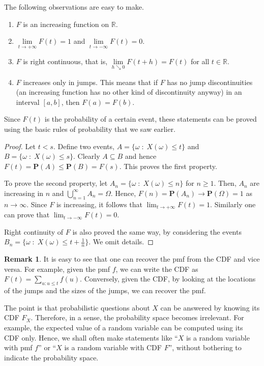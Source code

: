 \documentclass[preprint,  11pt]{amsart}
\newcommand{\para}[1]{\vspace{4mm}\noindent{\bfseries #1:}}
\theoremstyle{plain} %
\theoremstyle{definition} %
\newtheorem{remark}[theorem]{Remark}
\begin{document}
\para{Basic properties of a CDF} The following observations are easy to make.
\begin{enumerate}\setlength\itemsep{6pt}
\item $F$ is an increasing function on $\mathbb{R}$.
\item $\lim\limits_{t\rightarrow +\infty}F(t)=1$ and $\lim\limits_{t\rightarrow -\infty}F(t)=0$.
\item $F$ is right continuous, that is, $\lim\limits_{h\searrow 0}F(t+h)=F(t)$ for all $t\in \mathbb{R}$.
\item $F$ increases only in jumps. This means that if $F$ has no jump discontinuities (an increasing function has no other kind of discontinuity anyway) in an interval $[a,b]$, then $F(a)=F(b)$.
\end{enumerate}
Since $F(t)$ is the probability of a certain event, these statements can be proved using the basic rules of probability that we saw earlier. 

\begin{proof} Let $t<s$. Define two events, $A=\{\omega {\; : \;} X(\omega)\le t\}$ and $B=\{\omega{\; : \;} X(\omega)\le s\}$. Clearly $A\subseteq B$ and hence $F(t)=\mathbf{P}(A)\le \mathbf{P}(B)=F(s)$. This proves the first property. 

To prove the second property, let $A_{n}=\{\omega {\; : \;} X(\omega)\le n\}$ for $n\ge 1$. Then, $A_{n}$ are increasing in $n$ and $\bigcup_{n=1}^{\infty}A_{n}=\Omega$. Hence, $F(n)=\mathbf{P}(A_{n})\rightarrow \mathbf{P}(\Omega)=1$ as $n\rightarrow \infty$. Since $F$ is increasing, it follows that $\lim_{t\rightarrow +\infty}F(t)=1$. Similarly one can prove that $\lim_{t\rightarrow -\infty}F(t)=0$.

Right continuity of $F$ is also proved the same way, by considering the events $B_{n}=\{\omega {\; : \;} X(\omega)\le t+\frac{1}{n}\}$. We omit details. 
\end{proof}
\begin{remark}
It is easy to see that one can recover the pmf from the CDF and vice versa. For example, given the pmf $f$, we can write the CDF as $F(t)=\sum_{u:u\le t}f(u)$. Conversely, given the CDF, by looking at the locations of the jumps and the sizes of the jumps, we can recover the pmf.
\end{remark}

The point is that probabilistic questions about $X$ can be answered by knowing its CDF $F_{X}$. Therefore, in a sense, the probability space becomes irrelevant. For example, the expected value of a random variable can be computed using its CDF only. Hence, we shall often make statements like ``$X$ is a random variable with pmf $f$'' or ``$X$ is a random variable with CDF $F$'', without bothering to indicate the probability space. 
\end{document}
